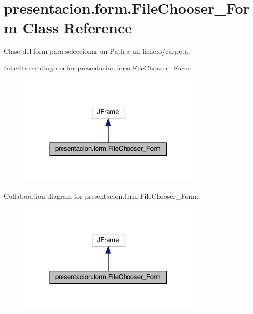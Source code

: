 \hypertarget{classpresentacion_1_1form_1_1FileChooser__Form}{}\section{presentacion.\+form.\+File\+Chooser\+\_\+\+Form Class Reference}
\label{classpresentacion_1_1form_1_1FileChooser__Form}


Clase del form para seleccionar un Path a un fichero/carpeta.  




Inheritance diagram for presentacion.\+form.\+File\+Chooser\+\_\+\+Form\+:
\nopagebreak
\begin{figure}[H]
\begin{center}
\leavevmode
\includegraphics[width=258pt]{classpresentacion_1_1form_1_1FileChooser__Form__inherit__graph}
\end{center}
\end{figure}


Collaboration diagram for presentacion.\+form.\+File\+Chooser\+\_\+\+Form\+:
\nopagebreak
\begin{figure}[H]
\begin{center}
\leavevmode
\includegraphics[width=258pt]{classpresentacion_1_1form_1_1FileChooser__Form__coll__graph}
\end{center}
\end{figure}
